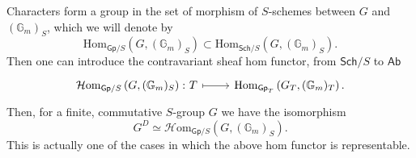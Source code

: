 \begin{rem}\label{rem:DualasHomFct}
	Characters form a group in the set of morphism of $S$-schemes
	between $G$ and $(\mathbb{G}_m)_S$, which we will denote by
	\begin{equation*}
		\mathrm{Hom}_{\mathsf{Gp}/S} \left( G, (\mathbb{G}_m)_S \right)
		\subset
		\mathrm{Hom}_{\mathsf{Sch}/S} \left( G, (\mathbb{G}_m)_S \right)
	.\end{equation*} 
	Then one can introduce the contravariant sheaf hom functor,
	from $\mathsf{Sch}/S$ to $\mathsf{Ab}$
	\begin{equation*}
	\begin{tikzcd}[row sep = 0ex
		,/tikz/column 1/.append style={anchor=base east}
		,/tikz/column 2/.append style={anchor=base west}]
		\mathcal{H}\mathrm{om}_{\mathsf{Gp}/S} \left( G, (\mathbb{G}_m)_S \right)\colon
		T \arrow[r, "", mapsto] & 
		\mathrm{Hom}_{\mathsf{Gp}_T} \left( G_T, (\mathbb{G}_m)_T \right)
	.\end{tikzcd}
	\end{equation*} 
	Then, for a finite, commutative $S$-group $G$ we have the isomorphism
	\begin{equation*}
		G^D \simeq \mathcal{H}\mathrm{om}_{\mathsf{Gp}/S} \left( G, (\mathbb{G}_m)_S \right)
	.\end{equation*} 
	This is actually one of the cases in which the above hom functor
	is representable.
\end{rem}


